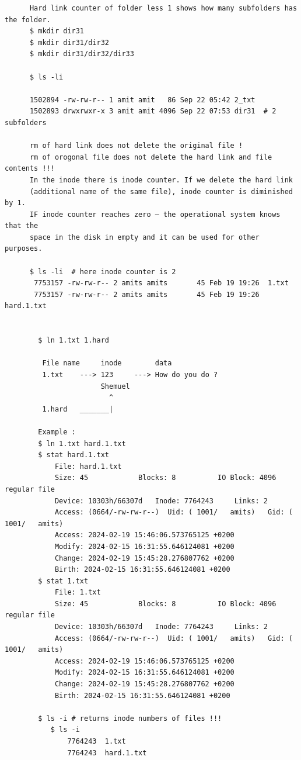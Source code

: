 \documentclass[a4paper,12pt]{article}
\begin{document}
\begin{verbatim}
      Hard link counter of folder less 1 shows how many subfolders has the folder.       
      $ mkdir dir31
      $ mkdir dir31/dir32
      $ mkdir dir31/dir32/dir33
      
      $ ls -li

      1502894 -rw-rw-r-- 1 amit amit   86 Sep 22 05:42 2_txt
      1502893 drwxrwxr-x 3 amit amit 4096 Sep 22 07:53 dir31  # 2 subfolders
      
      rm of hard link does not delete the original file !
      rm of orogonal file does not delete the hard link and file contents !!! 
      In the inode there is inode counter. If we delete the hard link 
      (additional name of the same file), inode counter is diminished by 1. 
      IF inode counter reaches zero – the operational system knows that the 
      space in the disk in empty and it can be used for other purposes.
      
      $ ls -li  # here inode counter is 2
       7753157 -rw-rw-r-- 2 amits amits       45 Feb 19 19:26  1.txt
       7753157 -rw-rw-r-- 2 amits amits       45 Feb 19 19:26  hard.1.txt

      
        $ ln 1.txt 1.hard
    
         File name     inode        data
         1.txt    ---> 123     ---> How do you do ?
                       Shemuel    
                         ^
         1.hard   _______|       

        Example : 
        $ ln 1.txt hard.1.txt
        $ stat hard.1.txt
            File: hard.1.txt
            Size: 45        	Blocks: 8          IO Block: 4096   regular file
            Device: 10303h/66307d	Inode: 7764243     Links: 2
            Access: (0664/-rw-rw-r--)  Uid: ( 1001/   amits)   Gid: ( 1001/   amits)
            Access: 2024-02-19 15:46:06.573765125 +0200
            Modify: 2024-02-15 16:31:55.646124081 +0200
            Change: 2024-02-19 15:45:28.276807762 +0200
            Birth: 2024-02-15 16:31:55.646124081 +0200
        $ stat 1.txt
            File: 1.txt
            Size: 45        	Blocks: 8          IO Block: 4096   regular file
            Device: 10303h/66307d	Inode: 7764243     Links: 2
            Access: (0664/-rw-rw-r--)  Uid: ( 1001/   amits)   Gid: ( 1001/   amits)
            Access: 2024-02-19 15:46:06.573765125 +0200
            Modify: 2024-02-15 16:31:55.646124081 +0200
            Change: 2024-02-19 15:45:28.276807762 +0200
            Birth: 2024-02-15 16:31:55.646124081 +0200
            
        $ ls -i # returns inode numbers of files !!!
           $ ls -i
               7764243  1.txt
               7764243  hard.1.txt


\end{verbatim}
\end{document}
